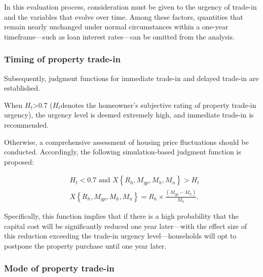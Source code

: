 \documentclass{mcmthesis}
\begin{document}
In this evaluation process, consideration must be given to the urgency of trade-in and the variables that evolve over time. 
Among these factors, quantities that remain nearly unchanged under normal circumstances 
within a one-year timeframe—such as loan interest rates—can be omitted from the analysis.


\subsubsection{Timing of property trade-in} %
Subsequently, judgment functions for immediate trade-in and delayed trade-in are established.

When $H_t$>0.7
($H_t$denotes the homeowner's subjective rating of property trade-in urgency), 
the urgency level is deemed extremely high, and immediate trade-in is recommended.

Otherwise, a comprehensive assessment of housing price fluctuations should be conducted. Accordingly, 
the following simulation-based judgment function is proposed:

\begin{equation}
\begin{aligned}
&H_t<0.7 \text { and } X\left\{R_h, M_{g p}, M_h, M_n\right\}>H_t\\
&X\left\{R_h, M_{g p}, M_h, M_n\right\}=R_h \times \frac{\left(M_{g p}-M_h\right)}{M_n} .
\end{aligned}
\end{equation}

Specifically, this function implies that if there is a high probability that the capital cost will 
be significantly reduced one year later—with the effect size of this reduction exceeding the trade-in 
urgency level—households will opt to postpone the property purchase until one year later.

\subsubsection{Mode of property trade-in } %
\end{document}
